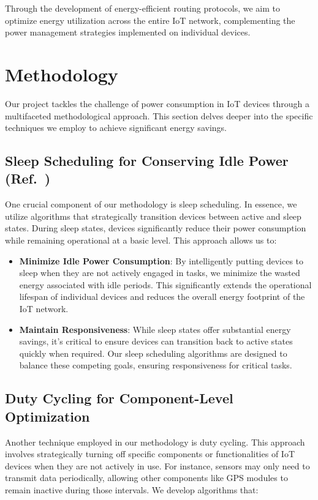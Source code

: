 \documentclass[11pt,a4paper]{article}
\begin{document}
Through the development of energy-efficient routing protocols, we aim to optimize energy utilization across the entire IoT network, complementing the power management strategies implemented on individual devices.



\section{Methodology}
Our project tackles the challenge of power consumption in IoT devices through a multifaceted methodological approach. This section delves deeper into the specific techniques we employ to achieve significant energy savings.

\subsection{Sleep Scheduling for Conserving Idle Power (Ref.~\cite{Akyildiz_Wireless_Sensor_Networks_2007, Xing_Survey_Energy_Efficient_MAC_2010})}

One crucial component of our methodology is sleep scheduling. In essence, we utilize algorithms that strategically transition devices between active and sleep states. During sleep states, devices significantly reduce their power consumption while remaining operational at a basic level. This approach allows us to:
\begin{itemize}
    \item \textbf{Minimize Idle Power Consumption}: By intelligently putting devices to sleep when they are not actively engaged in tasks, we minimize the wasted energy associated with idle periods. This significantly extends the operational lifespan of individual devices and reduces the overall energy footprint of the IoT network.

    \item \textbf{Maintain Responsiveness}: While sleep states offer substantial energy savings, it's critical to ensure devices can transition back to active states quickly when required. Our sleep scheduling algorithms are designed to balance these competing goals, ensuring responsiveness for critical tasks.
\end{itemize}

\subsection{Duty Cycling for Component-Level Optimization}

Another technique employed in our methodology is duty cycling. This approach involves strategically turning off specific components or functionalities of IoT devices when they are not actively in use. For instance, sensors may only need to transmit data periodically, allowing other components like GPS modules to remain inactive during those intervals. We develop algorithms that:
\end{document}

